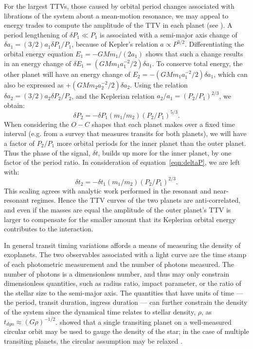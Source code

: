 \documentclass[graybox,natbib,nosecnum]{svmult}
\begin{document}
For the largest TTVs, those caused by orbital period changes associated with librations of the system about a mean-motion resonance, we may appeal to energy trades to compute the amplitude of the TTV in each planet (see \citealt{2005MNRAS.359..567A,2010Sci...330...51H}).  A period lengthening of $\delta P_1 \ll P_1$ is associated with a semi-major axis change of $\delta a_1 = (3/2) a_1 \delta P_1 / P_1$, because of Kepler's relation $a \propto P^{3/2}$.  Differentiating the orbital energy equation $E_1=-G M m_1 /(2a_1)$ shows that such a change results in an energy change of $\delta E_1=(GMm_1 a_1^{-2}/2) \delta a_1$.  To conserve total energy, the other planet will have an energy change of $E_2=-(GMm_1 a_1^{-2}/2) \delta a_1$, which can also be expressed as $+(GMm_2 a_2^{-2}/2)\delta a_2$.  Using the relation $\delta a_2 = (3/2) a_2 \delta P_2 / P_2$, and the Keplerian relation $a_2/a_1=(P_2/P_1)^{2/3}$, we obtain: 
\begin{equation}
\delta P_2 = -\delta P_1 (m_1/m_2) (P_2/P_1)^{5/3}. \label{eqn:deltaP}
\end{equation}
When considering the $O-C$ shapes that each planet makes over a fixed time interval (e.g. from a survey that measures transits for both planets), we will have a factor of $P_2/P_1$ more orbital periods for the inner planet than the outer planet.  Thus the phase of the signal, $\delta t$, builds up more for the inner planet, by one factor of the period ratio. In consideration of equation~\ref{eqn:deltaP}, we are left with: 
\begin{equation}
\delta t_2 = -\delta t_1 (m_1/m_2) (P_2/P_1)^{2/3}. \label{eqn:deltat}
\end{equation}
This scaling agrees with analytic work performed in the resonant \citep{2016ApJ...823...72N} and near-resonant \citep{2012ApJ...761..122L,2016ApJ...828...44H} regimes. Hence the TTV curves of the two planets are anti-correlated, and even if the masses are equal the amplitude of the outer planet's TTV is larger to compensate for the smaller amount that its Keplerian orbital energy contributes to the interaction. 

In general transit timing variations affords a means of measuring the density of exoplanets.
The two observables associated with a light curve are the time stamp of each photometric
measurement and the number of photons measured.  The number of photons is a dimensionless
number, and thus may only constrain dimensionless quantities, such as radius ratio, impact 
parameter, or the ratio of the stellar size to the semi-major axis.  The quantities that 
have units of time --- the period, transit duration, ingress duration ---  can further
constrain the density of the system since the dynamical time relates to stellar density, $\rho$, as
$t_{dyn} \approx (G\rho)^{-1/2}$.  \citet{2003ApJ...585.1038S} showed that a single transiting planet
on a well-measured circular orbit may be used to gauge the density of the star;
in the case of multiple transiting planets, the circular assumption may be relaxed
\citep{2014MNRAS.440.2164K}.
\end{document}
